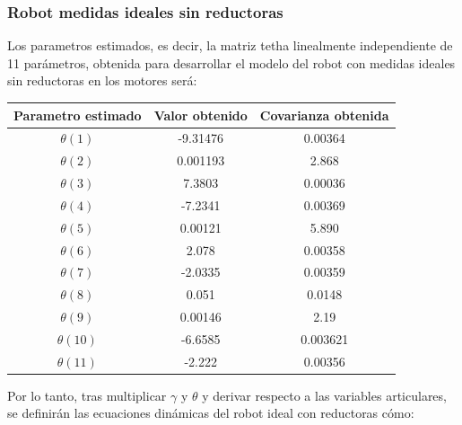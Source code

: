 \subsubsection{Robot medidas ideales sin reductoras}
Los parametros estimados, es decir, la matriz tetha linealmente independiente de 11 parámetros, obtenida para desarrollar el modelo del robot con medidas ideales sin reductoras en los motores será:
\begin{center}
	\begin{tabular}{| c | c | c |}

		\hline
		Parametro estimado & Valor obtenido & Covarianza obtenida \\
		\hline
		$\theta(1) $ & -9.31476 & 0.00364 \\
		\hline
		$\theta(2) $ & 0.001193 & 2.868 \\
		\hline
		$\theta(3) $ & 7.3803 & 0.00036 \\
		\hline
		$\theta(4) $ & -7.2341 & 0.00369 \\
		\hline
		$\theta(5) $ & 0.00121 & 5.890 \\
		\hline
		$\theta(6) $ & 2.078 & 0.00358 \\
		\hline
		$\theta(7) $ & -2.0335 & 0.00359 \\
		\hline
		$\theta(8) $ & 0.051 & 0.0148 \\
		\hline
		$\theta(9) $ & 0.00146 & 2.19 \\
		\hline
		$\theta(10) $ & -6.6585 & 0.003621 \\
		\hline
		$\theta(11) $ & -2.222 & 0.00356 \\
		\hline
	\end{tabular}
\end{center}
Por lo tanto, tras multiplicar $\gamma$ y $\theta$ y derivar respecto a las variables articulares, se definirán las ecuaciones dinámicas del robot ideal con reductoras cómo:\\
